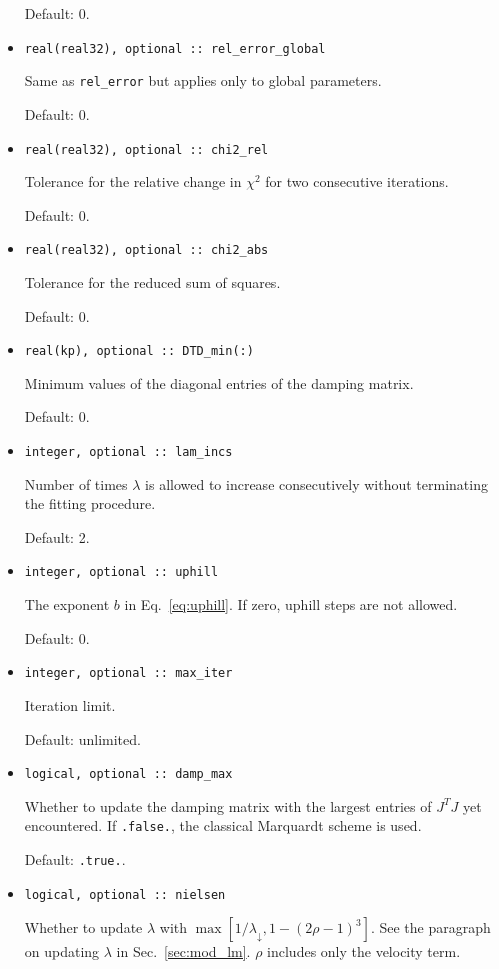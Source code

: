\documentclass{article}
\begin{document}
\begin{itemize}
  Default: 0.
\item
\begin{verbatim}
real(real32), optional :: rel_error_global
\end{verbatim}
  Same as \verb+rel_error+ but applies only to global parameters.

  Default: 0.
\item
\begin{verbatim}
real(real32), optional :: chi2_rel
\end{verbatim}
  Tolerance for the relative change in $\chi^2$ for two consecutive iterations.

  Default: 0.
\item
\begin{verbatim}
real(real32), optional :: chi2_abs
\end{verbatim}
  Tolerance for the reduced sum of squares.

  Default: 0.
\item
\begin{verbatim}
real(kp), optional :: DTD_min(:)
\end{verbatim}
  Minimum values of the diagonal entries of the damping matrix.

  Default: 0.
\item
\begin{verbatim}
integer, optional :: lam_incs
\end{verbatim}
  Number of times $\lambda$ is allowed to increase consecutively without terminating the fitting procedure.

  Default: 2.
\item
\begin{verbatim}
integer, optional :: uphill
\end{verbatim}
  The exponent $b$ in Eq.~\eqref{eq:uphill}. If zero, uphill steps are not allowed.

  Default: 0.
\item
\begin{verbatim}
integer, optional :: max_iter
\end{verbatim}
  Iteration limit.

  Default: unlimited.
\item
\begin{verbatim}
logical, optional :: damp_max
\end{verbatim}
  Whether to update the damping matrix with the largest entries of $J^TJ$ yet encountered. If \texttt{.false.}, the classical Marquardt scheme is used.

  Default: \texttt{.true.}.
\item
\begin{verbatim}
logical, optional :: nielsen
\end{verbatim}
  Whether to update $\lambda$ with $\max[1/\lambda_\downarrow,1-(2\rho-1)^3]$. See the paragraph on updating $\lambda$ in Sec.~\ref{sec:mod_lm}. $\rho$ includes only the velocity term.


\end{itemize}
\end{document}
